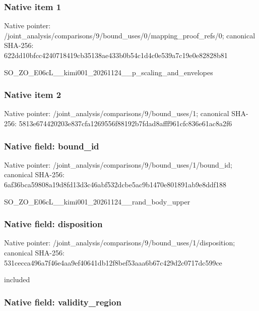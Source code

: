 \documentclass[10pt,a4paper]{article}
\begin{document}
\subsubsection{Native item 1}


Native pointer: /joint\_analysis/comparis\allowbreak{}ons/9/bound\_uses/0/mappi\allowbreak{}ng\_proof\_refs/0; canonical SHA-256: 622dd10bfcc4240718419cb3\allowbreak{}5138ae433b0b54c1d4c0e539\allowbreak{}a7c19e0e82828b81


SO\_ZO\_E06cL\_\_kimi001\_202\allowbreak{}61124\_\_p\_scaling\_and\_env\allowbreak{}elopes


\subsubsection{Native item 2}


Native pointer: /joint\_analysis/comparis\allowbreak{}ons/9/bound\_uses/1; canonical SHA-256: 5813e674420203e837cfa126\allowbreak{}9556f88192b7fdad8afff961\allowbreak{}cfc836e61ac8a2f6



\subsubsection{Native field: bound\_id}


Native pointer: /joint\_analysis/comparis\allowbreak{}ons/9/bound\_uses/1/bound\allowbreak{}\_id; canonical SHA-256: 6af36bca59808a19d8fd13d3\allowbreak{}c46abf532dcbe5ac9b1470e8\allowbreak{}01891ab9e8ddf188


SO\_ZO\_E06cL\_\_kimi001\_202\allowbreak{}61124\_\_rand\_body\_upper


\subsubsection{Native field: disposition}


Native pointer: /joint\_analysis/comparis\allowbreak{}ons/9/bound\_uses/1/dispo\allowbreak{}sition; canonical SHA-256: 531cecca496a7f46e4aa9ef4\allowbreak{}0641db12f8bef53aaa6b67c4\allowbreak{}29d2c0717dc599ce


included


\subsubsection{Native field: validity\_region}
\end{document}
